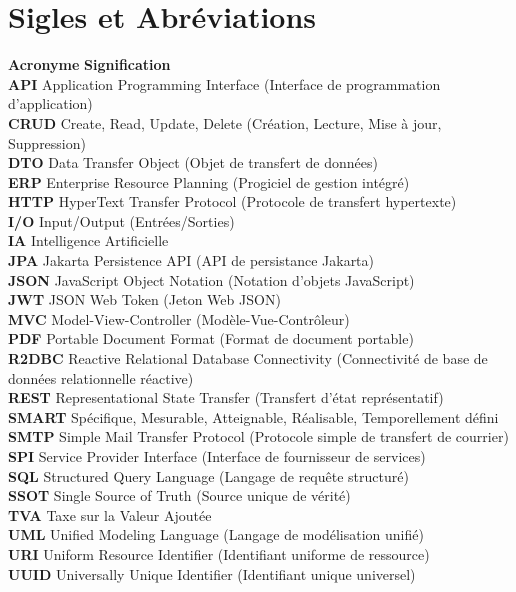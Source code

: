 \chapter*{Sigles et Abréviations}

\begin{tabbing}
\textbf{Acronyme} \hspace{3cm} \= \textbf{Signification} \\
\textbf{API} \> Application Programming Interface (Interface de programmation d'application) \\
\textbf{CRUD} \> Create, Read, Update, Delete (Création, Lecture, Mise à jour, Suppression) \\
\textbf{DTO} \> Data Transfer Object (Objet de transfert de données) \\
\textbf{ERP} \> Enterprise Resource Planning (Progiciel de gestion intégré) \\
\textbf{HTTP} \> HyperText Transfer Protocol (Protocole de transfert hypertexte) \\
\textbf{I/O} \> Input/Output (Entrées/Sorties) \\
\textbf{IA} \> Intelligence Artificielle \\
\textbf{JPA} \> Jakarta Persistence API (API de persistance Jakarta) \\
\textbf{JSON} \> JavaScript Object Notation (Notation d'objets JavaScript) \\
\textbf{JWT} \> JSON Web Token (Jeton Web JSON) \\
\textbf{MVC} \> Model-View-Controller (Modèle-Vue-Contrôleur) \\
\textbf{PDF} \> Portable Document Format (Format de document portable) \\
\textbf{R2DBC} \> Reactive Relational Database Connectivity (Connectivité de base de données relationnelle réactive) \\
\textbf{REST} \> Representational State Transfer (Transfert d'état représentatif) \\
\textbf{SMART} \> Spécifique, Mesurable, Atteignable, Réalisable, Temporellement défini \\
\textbf{SMTP} \> Simple Mail Transfer Protocol (Protocole simple de transfert de courrier) \\
\textbf{SPI} \> Service Provider Interface (Interface de fournisseur de services) \\
\textbf{SQL} \> Structured Query Language (Langage de requête structuré) \\
\textbf{SSOT} \> Single Source of Truth (Source unique de vérité) \\
\textbf{TVA} \> Taxe sur la Valeur Ajoutée \\
\textbf{UML} \> Unified Modeling Language (Langage de modélisation unifié) \\
\textbf{URI} \> Uniform Resource Identifier (Identifiant uniforme de ressource) \\
\textbf{UUID} \> Universally Unique Identifier (Identifiant unique universel) \\
\end{tabbing}
